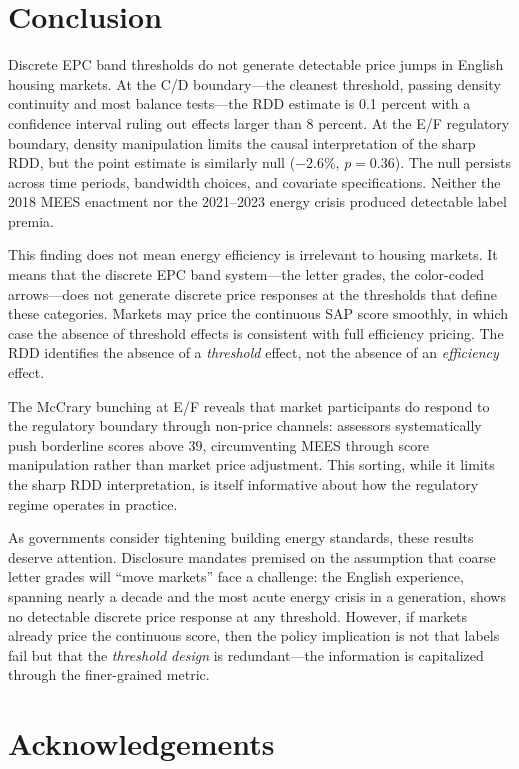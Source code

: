 \documentclass[12pt]{article}
\begin{document}
\section{Conclusion}\label{sec:conclusion}

Discrete EPC band thresholds do not generate detectable price jumps in English housing markets. At the C/D boundary---the cleanest threshold, passing density continuity and most balance tests---the RDD estimate is 0.1 percent with a confidence interval ruling out effects larger than 8 percent. At the E/F regulatory boundary, density manipulation limits the causal interpretation of the sharp RDD, but the point estimate is similarly null ($-2.6\%$, $p = 0.36$). The null persists across time periods, bandwidth choices, and covariate specifications. Neither the 2018 MEES enactment nor the 2021--2023 energy crisis produced detectable label premia.

This finding does not mean energy efficiency is irrelevant to housing markets. It means that the discrete EPC band system---the letter grades, the color-coded arrows---does not generate discrete price responses at the thresholds that define these categories. Markets may price the continuous SAP score smoothly, in which case the absence of threshold effects is consistent with full efficiency pricing. The RDD identifies the absence of a \textit{threshold} effect, not the absence of an \textit{efficiency} effect.

The McCrary bunching at E/F reveals that market participants do respond to the regulatory boundary through non-price channels: assessors systematically push borderline scores above 39, circumventing MEES through score manipulation rather than market price adjustment. This sorting, while it limits the sharp RDD interpretation, is itself informative about how the regulatory regime operates in practice.

As governments consider tightening building energy standards, these results deserve attention. Disclosure mandates premised on the assumption that coarse letter grades will ``move markets'' face a challenge: the English experience, spanning nearly a decade and the most acute energy crisis in a generation, shows no detectable discrete price response at any threshold. However, if markets already price the continuous score, then the policy implication is not that labels fail but that the \textit{threshold design} is redundant---the information is capitalized through the finer-grained metric.

\section*{Acknowledgements}
\end{document}
